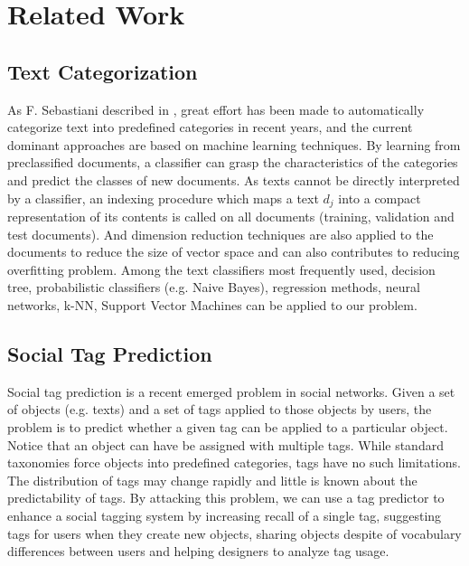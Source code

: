 \section{Related Work}
\subsection{Text Categorization}

As F. Sebastiani described in \cite{DBLP:journals/csur/Sebastiani02}, great effort has been made to automatically categorize text into predefined categories in recent years, and the current dominant approaches are based on machine learning techniques. By learning from preclassified documents, a classifier can grasp the characteristics of the categories and predict the classes of new documents. 
As texts cannot be directly interpreted by a classifier, an indexing procedure which maps a text $d_j$ into a compact representation of its contents is called on all documents (training, validation and test documents). And dimension reduction techniques are also applied to the documents to reduce the size of vector space and can also contributes to reducing overfitting problem. Among the text classifiers most frequently used, decision tree, probabilistic classifiers (e.g. Naive Bayes), regression methods, neural networks, k-NN, Support Vector Machines can be applied to our problem.

\subsection{Social Tag Prediction}
Social tag prediction \cite{DBLP:conf/sigir/HeymannRG08} is a recent emerged problem in social networks. Given a set of objects (e.g. texts) and a set of tags applied to those objects by users, the problem is to predict whether a given tag can be applied to a particular object. Notice that an object can have be assigned with multiple tags. While standard taxonomies force objects into predefined categories, tags have no such limitations. The distribution of tags may change rapidly and little is known about the predictability of tags. By attacking this problem, we can use a tag predictor to enhance a social tagging system by increasing recall of a single tag, suggesting tags for users when they create new objects, sharing objects despite of vocabulary differences between users and helping designers to analyze tag usage.
